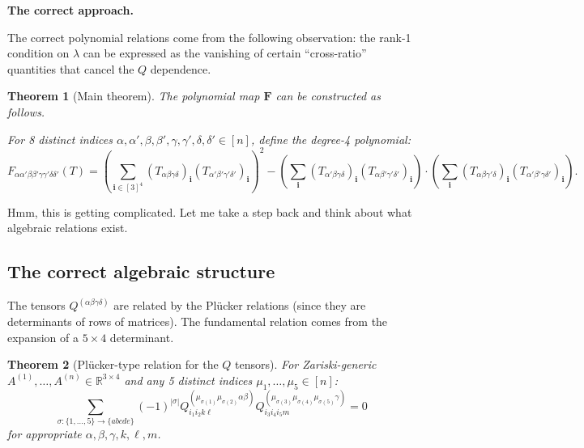 \documentclass[12pt]{article}
\newtheorem{theorem}{Theorem}
\begin{document}
\textbf{The correct approach.}

The correct polynomial relations come from the following observation: the rank-1 condition on $\lambda$ can be expressed as the vanishing of certain ``cross-ratio'' quantities that cancel the $Q$ dependence.

\begin{theorem}[Main theorem]\label{thm:main2}
The polynomial map $\mathbf{F}$ can be constructed as follows.

For 8 distinct indices $\alpha, \alpha', \beta, \beta', \gamma, \gamma', \delta, \delta' \in [n]$, define the degree-4 polynomial:
\begin{equation}\label{eq:F-correct}
F_{\alpha\alpha'\beta\beta'\gamma\gamma'\delta\delta'}(T) = \left(\sum_{\mathbf{i} \in [3]^4} (T_{\alpha\beta\gamma\delta})_\mathbf{i} (T_{\alpha'\beta'\gamma'\delta'})_\mathbf{i}\right)^2 - \left(\sum_{\mathbf{i}} (T_{\alpha'\beta\gamma\delta})_\mathbf{i}(T_{\alpha\beta'\gamma'\delta'})_\mathbf{i}\right) \cdot \left(\sum_\mathbf{i}(T_{\alpha\beta\gamma'\delta})_\mathbf{i}(T_{\alpha'\beta'\gamma\delta'})_\mathbf{i}\right).
\end{equation}

\end{theorem}

Hmm, this is getting complicated. Let me take a step back and think about what algebraic relations exist.

\subsection{The correct algebraic structure}

The tensors $Q^{(\alpha\beta\gamma\delta)}$ are related by the Plücker relations (since they are determinants of rows of matrices). The fundamental relation comes from the expansion of a $5 \times 4$ determinant.

\begin{theorem}[Plücker-type relation for the $Q$ tensors]\label{thm:plucker}
For Zariski-generic $A^{(1)}, \ldots, A^{(n)} \in \mathbb{R}^{3\times 4}$ and any 5 distinct indices $\mu_1, \ldots, \mu_5 \in [n]$:
\begin{equation}\label{eq:plucker}
\sum_{\sigma: \{1,\ldots,5\} \to \{abcde\}} (-1)^{|\sigma|} Q^{(\mu_{\sigma(1)}\mu_{\sigma(2)}\alpha\beta)}_{i_1 i_2 k \ell} Q^{(\mu_{\sigma(3)}\mu_{\sigma(4)}\mu_{\sigma(5)}\gamma)}_{i_3 i_4 i_5 m} = 0
\end{equation}
for appropriate $\alpha, \beta, \gamma, k, \ell, m$.
\end{theorem}
\end{document}
